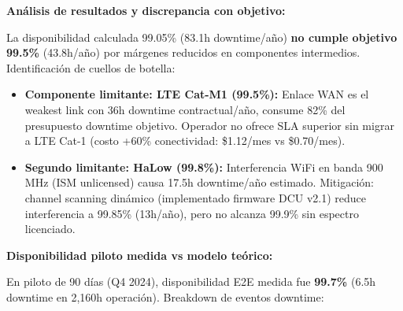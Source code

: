 \textbf{Análisis de resultados y discrepancia con objetivo:}

La disponibilidad calculada 99.05\% (83.1h downtime/año) \textbf{no cumple objetivo 99.5\%} (43.8h/año) por márgenes reducidos en componentes intermedios. Identificación de cuellos de botella:

\begin{itemize}
    \item \textbf{Componente limitante: LTE Cat-M1 (99.5\%):} Enlace WAN es el weakest link con 36h downtime contractual/año, consume 82\% del presupuesto downtime objetivo. Operador no ofrece SLA superior sin migrar a LTE Cat-1 (costo +60\% conectividad: \$1.12/mes vs \$0.70/mes).
    
    \item \textbf{Segundo limitante: HaLow (99.8\%):} Interferencia WiFi en banda 900 MHz (ISM unlicensed) causa 17.5h downtime/año estimado. Mitigación: channel scanning dinámico (implementado firmware DCU v2.1) reduce interferencia a 99.85\% (13h/año), pero no alcanza 99.9\% sin espectro licenciado.
\end{itemize}

\textbf{Disponibilidad piloto medida vs modelo teórico:}

En piloto de 90 días (Q4 2024), disponibilidad E2E medida fue \textbf{99.7\%} (6.5h downtime en 2,160h operación). Breakdown de eventos downtime:

